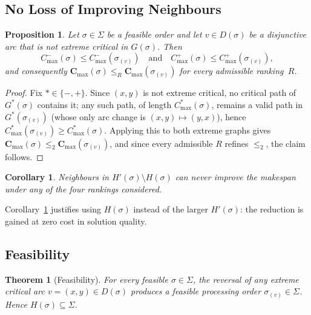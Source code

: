 \documentclass[preprint,12pt]{elsarticle}
\newtheorem{theorem}{Theorem}
\newtheorem{proposition}{Proposition}
\newtheorem{corollary}{Corollary}
\begin{document}
\subsection{No Loss of Improving Neighbours}
\label{sec:H-noloss}

\begin{proposition}
\label{prop2}
Let $\sigma \in \Sigma$ be a feasible order and let $v \in D(\sigma)$ be a disjunctive arc that is \emph{not} extreme critical in $G(\sigma)$. Then
\begin{equation}
C^-_{\max}(\sigma) \leq C^-_{\max}(\sigma_{(v)}) \quad\text{and}\quad C^+_{\max}(\sigma) \leq C^+_{\max}(\sigma_{(v)}),
\end{equation}
and consequently $\mathbf{C}_{\max}(\sigma) \leq_{R} \mathbf{C}_{\max}(\sigma_{(v)})$ for every admissible ranking~$R$.
\end{proposition}

\begin{proof}
Fix $*\in\{-,+\}$. Since $(x,y)$ is not extreme critical, no critical path of $G^*(\sigma)$ contains it; any such path, of length $C^*_{\max}(\sigma)$, remains a valid path in $G^*(\sigma_{(v)})$ (whose only arc change is $(x,y)\mapsto(y,x)$), hence $C^*_{\max}(\sigma_{(v)})\ge C^*_{\max}(\sigma)$. Applying this to both extreme graphs gives $\mathbf{C}_{\max}(\sigma)\le_2\mathbf{C}_{\max}(\sigma_{(v)})$, and since every admissible $R$ refines $\le_2$, the claim follows.
\end{proof}

\medskip

\begin{corollary}
\label{cor1}
Neighbours in $H'(\sigma) \setminus H(\sigma)$ can never improve the makespan under any of the four rankings considered.
\end{corollary}

Corollary~\ref{cor1} justifies using $H(\sigma)$ instead of the larger $H'(\sigma)$: the reduction is gained at zero cost in solution quality.

\subsection{Feasibility}
\label{sec:H-feasibility}

\begin{theorem}[Feasibility]
\label{thm1}
For every feasible $\sigma \in \Sigma$, the reversal of any extreme critical arc $v = (x,y) \in D(\sigma)$ produces a feasible processing order $\sigma_{(v)} \in \Sigma$. Hence $H(\sigma) \subseteq \Sigma$.
\end{theorem}
\end{document}
